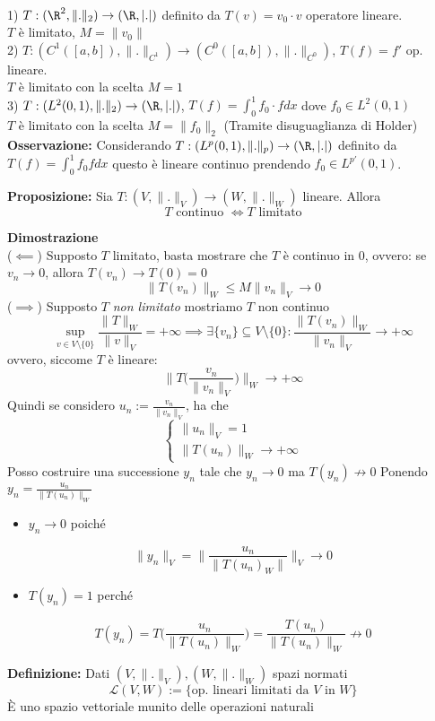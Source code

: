 \\1) $T:(\R^2,\|.\|_2)\to (\R,|.|)$ definito da $T(v)=v_0\cdot v$ operatore lineare.
\\$T$ è limitato, $M=\|v_0\|$ 
\\2) $T:(C^1([a,b]),\|.\|_{C^1})\to (C^0([a,b]),\|.\|_{C^0})$, $T(f)=f'$ op. lineare.
\\$T$ è limitato con la scelta $M=1$
\\3) $T:(L^{2}(0,1),\|.\|_2)\to (\R,|.|)$, $T(f)=\int_{0}^{1} f_0\cdot fdx $ dove $f_0\in L^{2}(0,1)$ 
\\$T$ è limitato con la scelta $M=\|f_0\|_2$ (Tramite disuguaglianza di Holder)
\\\textbf{Osservazione:} Considerando $T:(L^{p}(0,1),\|.\|_p)\to (\R,|.|)$ definito da $T(f)=\int_{0}^{1} f_0fdx $ questo è lineare continuo prendendo $f_0\in L^{p'}(0,1)$.
\\\divider
\begin{tcolorbox}
	\textbf{Proposizione: }Sia $T:(V,\|.\|_V)\to (W,\|.\|_W)$ lineare. Allora
	\[T\text{ continuo }\iff T \text{ limitato}\]
\end{tcolorbox}
\textbf{Dimostrazione} 
\\($\impliedby$) Supposto $T$ limitato, basta mostrare che $T$ è continuo in $0$, ovvero: se $v_n\to 0$, allora $T(v_n)\to T(0)=0$ 
\[\|T(v_n)\|_W\le M \|v_n\|_V\to 0\]
($\implies$) Supposto $T$ \emph{non limitato} mostriamo $T$ non continuo
\[\sup_{v\in V\setminus \{0\} }\frac{\|T\|_W}{\|v\|_V}=+\infty\implies \exists \{v_n\} \subseteq  V\setminus \{0\} :\frac{\|T(v_n)\|_W}{\|v_n\|_V}\to +\infty\]
ovvero, siccome $T$ è lineare:
\[\bigg\|T\bigg(\frac{v_n}{\|v_n\|_V}\bigg)\bigg\|_W\to +\infty\]
Quindi se considero $u_n:= \frac{v_n}{\|v_n\|_V}$, ha che 
\[\begin{cases}
	\|u_n\|_V=1\\
	\|T(u_n)\|_W\to +\infty
\end{cases}\]
Posso costruire una successione $y_n$ tale che $y_n\to 0$ ma $T(y_n)\not \to 0$
Ponendo $y_n= \frac{u_n}{\|T(u_n)\|_W}$
\begin{itemize}
	\item $y_n\to 0$ poiché 
\end{itemize}
\[\|y_n\|_V=\bigg\|\frac{u_n}{\|T(u_n)_W\|}\bigg\|_V\to 0\]
\begin{itemize}
	\item $T(y_n)=1$ perché
\end{itemize}
\[T(y_n)=T\bigg( \frac{u_n}{\|T(u_n)\|_W} \bigg)= \frac{T(u_n)}{\|T(u_n)\|_W}\not\to 0\]
\begin{tcolorbox}
	\textbf{Definizione: }Dati $(V,\|.\|_V),(W,\|.\|_W)$ spazi normati
	\[\mathcal L(V,W):=\{\text{op. lineari limitati da } V \text{ in }W\}\] 
	È uno spazio vettoriale munito delle operazioni naturali
\end{tcolorbox}
